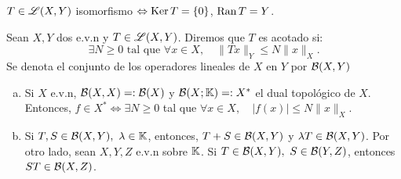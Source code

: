 \begin{note}
	$T \in \mathscr{L}(X,Y)$ isomorfismo $\Leftrightarrow \operatorname{Ker} T = \{0\}$, $\operatorname{Ran} T = Y$. 
\end{note}

\begin{definition}
	Sean $X,Y$ dos e.v.n y $T \in \mathscr{L}(X,Y)$. Diremos que $T$ es acotado si:
	\[ \exists N \geq 0 \text{ tal que } \forall x \in X, \quad \| Tx \|_{Y} \leq N \| x \|_{X}. \]
	Se denota el conjunto de los operadores lineales de $X$ en $Y$ por $\mathcal{B}(X,Y)$
\end{definition}

\begin{observe}
	\begin{enumerate}[a)]
		\item Si $X$ e.v.n, $\mathcal{B}(X,X) =: \mathcal{B}(X)$ y $\mathcal{B}(X; \mathbb{K}) =: X^{*}$ el dual topológico de $X$. Entonces, $f \in X^{*} \iff \exists N \geq 0$ tal que $\forall x \in X, \quad |f(x)| \leq N \| x \|_{X}$.

		\item Si $T,S \in \mathcal{B}(X,Y),\ \lambda \in \mathbb{K}$, entonces, $T + S \in \mathcal{B}(X,Y)$ y $\lambda T \in \mathcal{B}(X,Y)$. Por otro lado, sean $X,Y,Z$ e.v.n sobre $\mathbb{K}$. Si $T \in \mathcal{B}(X,Y),\ S \in \mathcal{B}(Y,Z)$, entonces $ST \in \mathcal{B}(X,Z)$.
	\end{enumerate}
\end{observe}

